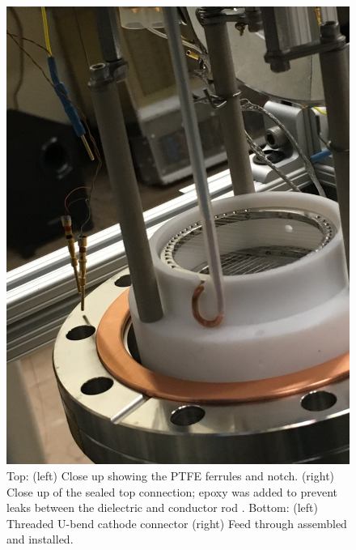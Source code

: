 \begin{figure}[htbp]
\begin{minipage}{0.47\textwidth}
    \includegraphics[width=\linewidth, angle=270]{figures/testbed/ft5_4.jpg}
    \end{minipage}
\caption{Top: (left) Close up showing the \ac{PTFE} ferrules and notch. (right) Close up of the sealed top connection; epoxy was added to prevent leaks between the dielectric and conductor rod . Bottom: (left) Threaded U-bend cathode connector (right) Feed through assembled and installed.}
 \label{fig:ssrodft}
\end{figure}



